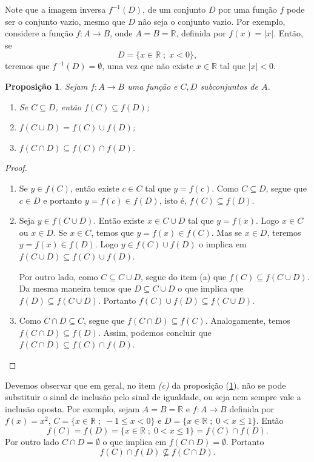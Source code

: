 \documentclass[a4paper,12pt]{monografia}
\theoremstyle{plain}
\newtheorem{proposition}{Proposi\c{c}\~ao}[section]
\theoremstyle{definition}
\theoremstyle{remark}
\newcommand{\R}{\mathbb{R}}
\begin{document}
Note que a imagem inversa $f^{-1}(D)$, de um conjunto $D$ por uma
fun\c{c}\~ao $f$ pode ser o conjunto vazio, mesmo que $D$ n\~ao seja o
conjunto vazio. Por exemplo, considere a fun\c{c}\~ao $f:A \rightarrow
B$, onde $A=B=\R$, definida por $f(x)=|x|$. Ent\~ao, se $$D=\{x \in
\R\;;\; x<0\},$$ teremos que $f^{-1}(D)=\emptyset$, uma vez que
n\~ao existe $x \in \R$ tal que $|x|<0$.

\begin{proposition}\label{Img-direta}
Sejam $f:A \rightarrow B$ uma fun\c{c}\~ao e $C, D$ subconjuntos de $A$.
\begin{enumerate}
    \item[(a)] Se $C \subseteq D$, ent\~ao $f(C)\subseteq f(D)$;
    \item[(b)] $f(C \cup D)=f(C)\cup f(D)$;
    \item[(c)] $f(C \cap D) \subseteq f(C)\cap f(D)$.
\end{enumerate}
\end{proposition}
\begin{proof}\mbox{}
\begin{enumerate}
    \item[(a)] Se $y \in f(C)$, ent\~ao existe $c \in C$ tal que $y
    = f(c)$. Como $C \subseteq D$, segue que $c \in D$ e portanto
    $y=f(c) \in f(D)$, isto \'e, $f(C)\subseteq f(D)$.
    \item[(b)] Seja $y \in f(C \cup D)$. Ent\~ao existe $x \in C \cup
    D$ tal que $y=f(x)$. Logo $x \in C$ ou $x \in D$. Se $x \in
    C$, temos que $y=f(x) \in f(C)$. Mas se $x \in D$, teremos
    $y=f(x) \in f(D)$. Logo $y \in f(C) \cup f(D)$ o implica em
    $f(C \cup D)\subseteq f(C)\cup f(D)$.

    Por outro lado, como $C \subseteq C \cup D$, segue do item (a)
    que $f(C) \subseteq f(C \cup D)$. Da mesma maneira temos que $D
    \subseteq C \cup D$ o que implica que $f(D) \subseteq f(C \cup D)$.
    Portanto $f(C)\cup f(D)\subseteq f(C \cup D)$.
    \item[(c)] Como $C \cap D \subseteq C$, segue que $f(C\cap D)
    \subseteq f(C)$. Analogamente, temos $f(C\cap D)\subseteq
    f(D)$. Assim, podemos concluir que $f(C \cap D) \subseteq
    f(C)\cap f(D)$.
\end{enumerate}
\end{proof}

Devemos observar que em geral, no item \emph{(c)} da proposi\c{c}\~ao
(\ref{Img-direta}), n\~ao se pode substituir o sinal de inclus\~ao
pelo sinal de igualdade, ou seja nem sempre vale a inclus\~ao
oposta. Por exemplo, sejam $A=B=\R$ e $f:A \rightarrow B$ definida
por $f(x)=x^2$, $C=\{x \in \R\;;\; -1 \leq x <0\}$ e $D=\{x \in \R
\;;\; 0 <x \leq 1\}$. Ent\~ao
$$
f(C)=f(D)=\{x \in \R \;;\; 0 <x \leq 1\}=f(C)\cap f(D).
$$
Por outro lado $C \cap D= \emptyset$ o que implica em $f(C \cap
D)=\emptyset$. Portanto $$f(C)\cap f(D) \nsubseteq f(C \cap D).$$
\end{document}
